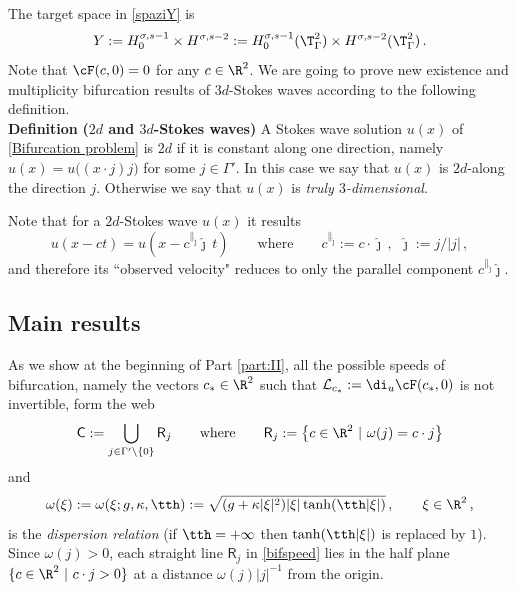 \documentclass[11pt,a4paper,reqno]{article}
\numberwithin{equation}{section}
\theoremstyle{definition}
\begin{document}
The target space in \eqref{spaziY} is 
\begin{equation}\label{spaceY}
Y := 
H^{\sigma,s-1}_0 \times H^{\sigma,s-2}
:= H^{\sigma,s-1}_0(\T^2_\Gamma) \times H^{\sigma,s-2}(\T^2_\Gamma)   \, . 
\end{equation}
Note that  $ \cF (c,0) = 0 $ for any $ c \in \R^2 $.
We are going to prove 
 new existence and multiplicity bifurcation results of $ 3d $-Stokes waves according to the following definition. 
\\[1mm]
{\bf Definition}
{\bf ($ 2d$ and $3d$-Stokes waves)}
A Stokes  wave  solution  $u(x) $
of \eqref{Bifurcation problem} is  $2d$ if  
it is  constant along one direction,  namely
  $   u(x)=  u\big((x\cdot j )j  \big) $
for some 
  $  j  \in \Gamma'  $.
  In this case 
  we say that $ u(x) $
  is $ 2d$-along the direction $j $. 
 Otherwise 
we say that 
$ u(x) $ is 
 {\it truly $3$-dimensional}. %

Note that  %
for a $2d$-Stokes wave $u(x) $
it results 
\begin{equation}\label{eq:cparallel intro}
u(x-ct) = u( x-c^{\parallel_{\hat \jmath}}\hat \jmath \, t ) \qquad 
\text{where}  
\qquad  c^{\parallel_{\hat \jmath}} := c\cdot \hat \jmath \, , 
\ \  \hat \jmath := j / |j| \, , 
\end{equation}
and therefore  its  ``observed  velocity" 
reduces to only the parallel component 
$    c^{\parallel_{\hat \jmath}}\hat \jmath $. 

\subsection{Main results} \label{sec:main results}
As we show at 
the beginning of  Part \ref{part:II}, 
all the possible speeds  of bifurcation, namely the vectors $c_*\in\R^2$ such that $ {\mathcal L}_{c_*} := \di_u \cF(c_*,0)$ is not invertible,  
form the web 
\begin{equation}
\label{bifspeed}
    \mathsf C := 
    \bigcup_{j \in \Gamma'\setminus \{0\}} {\mathsf R}_j     \qquad
\text{where} \qquad  
{\mathsf R}_j :=  \big\{ c\in \R^2 \ | \ \omega(j)=c \cdot j \big\}
\end{equation}
and
\begin{equation}\label{omega}
		\omega(\xi) :=\omega(\xi;g, \kappa,\tth) 
        :=
                \sqrt{(g+\kappa|\xi|^2) |\xi|\tanh(\tth |\xi|)} \, , 
            \qquad \xi \in \R^2 \, , 
	\end{equation}    
is the {\it dispersion relation} 
(if   $ \tth=+\infty $ then  
$\tanh(\tth |\xi|)$ is replaced by $ 1  $).
Since $ \omega (j) >0 $,  each straight line $ {\mathsf R}_j $ in \eqref{bifspeed} lies in the half plane $ \{ c \in \R^2 \ | \  c \cdot j > 0 \} $ 
at a distance $ \omega (j) |j|^{-1} $ from the origin. 
\end{document}
